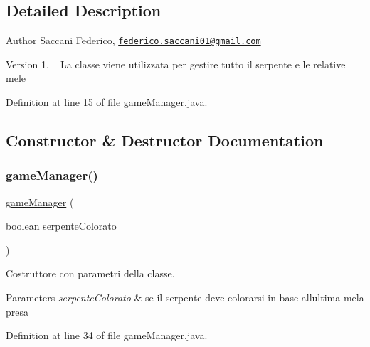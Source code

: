 \subsection{Detailed Description}
\begin{DoxyAuthor}{Author}
Saccani Federico, \href{mailto:federico.saccani01@gmail.com}{\tt federico.\+saccani01@gmail.\+com} 
\end{DoxyAuthor}
\begin{DoxyVersion}{Version}
1. ~\newline
La classe viene utilizzata per gestire tutto il serpente e le relative mele 
\end{DoxyVersion}


Definition at line 15 of file game\+Manager.\+java.



\subsection{Constructor \& Destructor Documentation}
\mbox{\label{class_snake_1_1game_1_1utility_1_1game_manager_a5751151adac49c0b87fa547f5e366dd9}} 
\subsubsection{\texorpdfstring{game\+Manager()}{gameManager()}}
{\footnotesize\ttfamily \mbox{\hyperlink{class_snake_1_1game_1_1utility_1_1game_manager}{game\+Manager}} (\begin{DoxyParamCaption}\item[{boolean}]{serpente\+Colorato }\end{DoxyParamCaption})}



Costruttore con parametri della classe. 


\begin{DoxyParams}{Parameters}
{\em serpente\+Colorato} & se il serpente deve colorarsi in base all\textquotesingle{}ultima mela presa \\
\hline
\end{DoxyParams}


Definition at line 34 of file game\+Manager.\+java.



